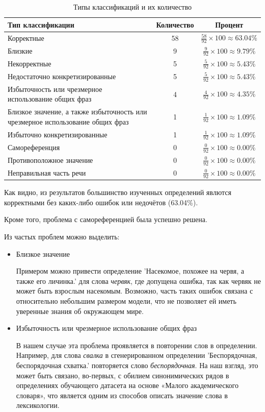 \documentclass[LI,VKR]{HSEUniversity}
\begin{document}
\begin{table}[H]
\centering
\caption{Типы классификаций и их количество}
\begin{tabular}{|>{\raggedright\arraybackslash}p{8cm}|c|c|}
\hline
\textbf{Тип классификации} & \textbf{Количество} & \textbf{Процент} \\ \hline
Корректные & 58 & $ \frac{58}{92} \times 100 \approx 63.04\% $ \\ \hline
Близкие & 9 & $ \frac{9}{92} \times 100 \approx 9.79\% $ \\ \hline
Некорректные & 5 & $ \frac{5}{92} \times 100 \approx 5.43\% $ \\ \hline
Недостаточно конкретизированные & 5 & $ \frac{5}{92} \times 100 \approx 5.43\% $ \\ \hline
Избыточность или чрезмерное использование общих фраз & 4 & $ \frac{4}{92} \times 100 \approx 4.35\% $ \\ \hline
Близкое значение, а также избыточность или чрезмерное использование общих фраз & 1 & $ \frac{1}{92} \times 100 \approx 1.09\% $ \\ \hline
Избыточно конкретизированные & 1 & $ \frac{1}{92} \times 100 \approx 1.09\% $ \\ \hline
Самореференция & 0 & $ \frac{0}{92} \times 100 \approx 0.00\% $ \\ \hline
Противоположное значение & 0 & $ \frac{0}{92} \times 100 \approx 0.00\% $ \\ \hline
Неправильная часть речи & 0 & $ \frac{0}{92} \times 100 \approx 0.00\% $ \\ \hline
\end{tabular}
\end{table}

Как видно, из результатов большинство изученных определений явлются корректными
без каких-либо ошибок или недочётов (63.04\%).

Кроме того, проблема с самореференцией была успешно решена.

Из частых проблем можно выделить:
\begin{itemize}
    \item Близкое значение

Примером можно привести определение ’Насекомое, похожее на червя, а также его личинка.’
для слова \textit{червяк},
где допущена ошибка, так как червяк не может быть взрослым насекомым.
Возможно, часть таких ошибок связана с относительно небольшим размером модели,
что не позволяет ей иметь уверенные знания об окружающем мире.
    \item Избыточность или чрезмерное использование общих фраз

В нашем случае эта проблема проявляется в повторении слов в определении.
Например, для слова \textit{свалка} в сгенерированном определении ’Беспорядочная, беспорядочная схватка.’
повторяется слово \textit{беспорядочная}.
На наш взгляд, это может быть связано, во-первых, с обилием синонимических рядов в определениях
обучающего датасета на основе «Малого академического словаря»,
что является одним из способов описать значение слова в лексикологии.

\end{itemize}
\end{document}
